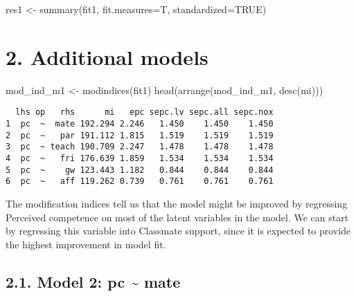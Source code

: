 \documentclass[
  letterpaper,
  DIV=11,
  numbers=noendperiod]{scrartcl}
\newenvironment{Shaded}{\begin{snugshade}}{\end{snugshade}}
\newcommand{\AttributeTok}[1]{\textcolor[rgb]{0.40,0.45,0.13}{#1}}
\newcommand{\ConstantTok}[1]{\textcolor[rgb]{0.56,0.35,0.01}{#1}}
\newcommand{\FunctionTok}[1]{\textcolor[rgb]{0.28,0.35,0.67}{#1}}
\newcommand{\NormalTok}[1]{\textcolor[rgb]{0.00,0.23,0.31}{#1}}
\newcommand{\OtherTok}[1]{\textcolor[rgb]{0.00,0.23,0.31}{#1}}
\begin{document}
\begin{Shaded}
\begin{Highlighting}[]
\NormalTok{res1 }\OtherTok{\textless{}{-}} \FunctionTok{summary}\NormalTok{(fit1, }\AttributeTok{fit.measures=}\NormalTok{T, }\AttributeTok{standardized=}\ConstantTok{TRUE}\NormalTok{)}
\end{Highlighting}
\end{Shaded}

\section{2. Additional models}\label{additional-models}

\begin{Shaded}
\begin{Highlighting}[]
\NormalTok{mod\_ind\_m1 }\OtherTok{\textless{}{-}} \FunctionTok{modindices}\NormalTok{(fit1)}
\FunctionTok{head}\NormalTok{(}\FunctionTok{arrange}\NormalTok{(mod\_ind\_m1, }\FunctionTok{desc}\NormalTok{(mi)))}
\end{Highlighting}
\end{Shaded}

\begin{verbatim}
  lhs op   rhs      mi   epc sepc.lv sepc.all sepc.nox
1  pc  ~  mate 192.294 2.246   1.450    1.450    1.450
2  pc  ~   par 191.112 1.815   1.519    1.519    1.519
3  pc  ~ teach 190.709 2.247   1.478    1.478    1.478
4  pc  ~   fri 176.639 1.859   1.534    1.534    1.534
5  pc  ~    gw 123.443 1.182   0.844    0.844    0.844
6  pc  ~   aff 119.262 0.739   0.761    0.761    0.761
\end{verbatim}

The modification indices tell us that the model might be improved by
regressing Perceived competence on most of the latent variables in the
model. We can start by regressing this variable into Classmate support,
since it is expected to provide the highest improvement in model fit.

\subsection{2.1. Model 2: pc \textasciitilde{}
mate}\label{model-2-pc-mate}
\end{document}
